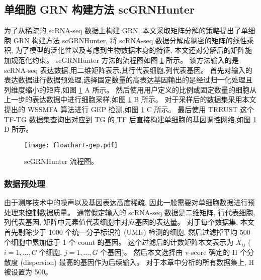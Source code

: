 \subsection{单细胞 GRN 构建方法 scGRNHunter}

为了从稀疏的 scRNA-seq 数据上构建 GRN, 
本文采取矩阵分解的策略提出了单细胞 GRN 构建方法 scGRNHunter, 
将 scRNA-seq 数据分解成稠密的矩阵的线性乘积,
为了模型的泛化性以及考虑到生物数据本身的特征, 本文还对分解后的矩阵施加规范化约束。
scGRNHunter 方法的流程图如图 \ref{fig:gep-flowchart} 所示。
该方法输入的是 scRNA-seq 表达数据,用二维矩阵表示,其行代表细胞,列代表基因。
首先对输入的表达数据进行数据预处理,选择固定数量的高表达基因输出的是经过归一化处理且列维度缩小的矩阵,如图 \ref{fig:gep-flowchart} A 所示。
然后使用用户定义的比例或固定数量的细胞从上一步的表达数据中进行细胞采样,如图 \ref{fig:gep-flowchart} B 所示。
对于采样后的数据集采用本文提出的 WSSMFA 算法进行 GEP 检测,如图 \ref{fig:gep-flowchart} C 所示。
最后使用 TRRUST 这个 TF-TG 数据集查询出对应到 TG 的 TF 后直接构建单细胞的基因调控网络,如图 \ref{fig:gep-flowchart} D 所示。

\begin{figure}[!htbp]
    \centering
    \texttt{[image: flowchart-gep.pdf]}
    \caption{
        scGRNHunter 流程图。
    }
    \label{fig:gep-flowchart}
\end{figure}

\subsubsection{数据预处理}
由于测序技术中的噪声以及基因表达高度稀疏, 因此一般需要对单细胞数据进行预处理来控制数据质量。
通常假定输入的 scRNA-seq 数据是二维矩阵, 行代表细胞, 列代表基因, 矩阵中元素值代表细胞中对应基因的表达量。
对于每个数据集, 本文首先剔除少于 1000 个统一分子标识符 (UMIs) 检测的细胞,
然后过滤掉平均 500 个细胞中累加低于 1 个 count 的基因。
这个过滤后的计数矩阵本文表示为 $X_{ij}$ ($i=1,\ldots,C$ 个细胞, $j=1,\ldots,G$ 个基因)。
然后本文选择由 v-score  确定的 H 个分散度 (dispersion) 最高的基因作为后续输入。
对于本章中分析的所有数据集上, H 被设置为 500。

